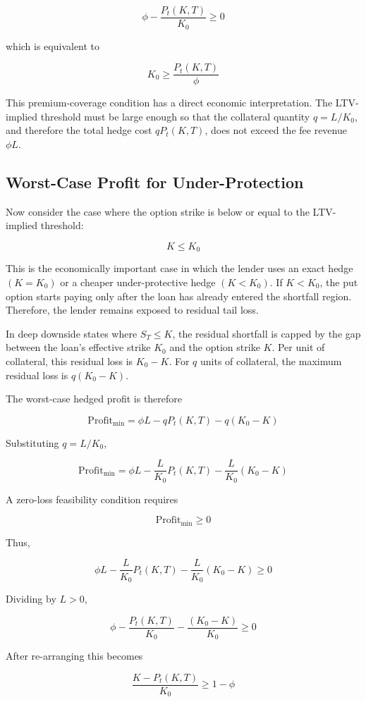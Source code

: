 \documentclass[11pt]{article}
\begin{document}
$$
\phi- \frac{P_t(K,T)}{K_0} \geq 0
$$

which is equivalent to

$$
K_0 \geq \frac{P_t(K,T)}{\phi}
$$

This premium-coverage condition has a direct economic interpretation. The LTV-implied threshold must be large enough so that the collateral quantity $q=L/K_0$, and therefore the total hedge cost $qP_t(K,T)$, does not exceed the fee revenue $\phi L$.

\subsection{Worst-Case Profit for Under-Protection}

Now consider the case where the option strike is below or equal to the LTV-implied threshold:

$$
K \leq K_0
$$

This is the economically important case in which the lender uses an exact hedge $(K=K_0)$ or a cheaper under-protective hedge $(K<K_0)$. If $K<K_0$, the put option starts paying only after the loan has already entered the shortfall region. Therefore, the lender remains exposed to residual tail loss.

In deep downside states where $S_T\leq K$, the residual shortfall is capped by the gap between the loan’s effective strike $K_0$ and the option strike $K$. Per unit of collateral, this residual loss is $K_0 - K$. For $q$ units of collateral, the maximum residual loss is $q(K_0 - K)$.

The worst-case hedged profit is therefore

$$
\text{Profit}_{\min} = 
\phi L - qP_t(K,T) - q(K_0 - K)
$$

Substituting $q=L/K_0$,

$$
\text{Profit}_{\min} = 
\phi L - \frac{L}{K_0}P_t(K,T) - \frac{L}{K_0}(K_0 - K)
$$

A zero-loss feasibility condition requires

$$
\text{Profit}_{\min} \geq 0
$$

Thus,

$$
\phi L - \frac{L}{K_0}P_t(K,T) - \frac{L}{K_0}(K_0 - K) \geq 0
$$

Dividing by $L>0$,

$$
\phi - \frac{P_t(K,T)}{K_0} - \frac{(K_0 - K)}{K_0} \geq 0
$$

After re-arranging this becomes

$$
\frac{K - P_t(K,T)}{K_0} \geq 1 - \phi
$$
\end{document}
